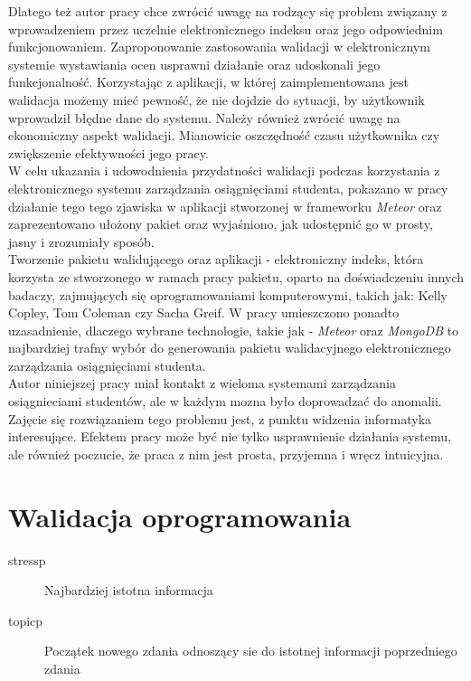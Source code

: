 \documentclass[brudnopis]{xmgr}
\begin{document}
\textcolor{wc}{Dlatego też autor pracy chce zwrócić uwagę na rodzący się problem związany
z wprowadzeniem przez uczelnie elektronicznego indeksu oraz jego odpowiednim
funkcjonowaniem. Zaproponowanie zastosowania walidacji w elektronicznym systemie
wystawiania ocen usprawni działanie oraz udoskonali jego funkcjonalność.
Korzystając z aplikacji, w której zaimplementowana jest walidacja możemy mieć pewność,
że nie dojdzie do sytuacji, by użytkownik wprowadził błędne dane do systemu.
Należy również zwrócić uwagę na ekonomiczny aspekt walidacji. Mianowicie oszczędność
czasu użytkownika czy zwiększenie efektywności jego pracy.}
\\
\indent \textcolor{wc}{W celu ukazania i udowodnienia przydatności walidacji podczas korzystania
z elektronicznego systemu zarządzania osiągnięciami studenta, pokazano w pracy
działanie tego tego zjawiska w aplikacji stworzonej w frameworku \textit{Meteor} oraz
zaprezentowano ułożony pakiet oraz wyjaśniono, jak udostępnić go w prosty, jasny
i zrozumiały sposób.}
\\
\indent \textcolor{wd}{Tworzenie pakietu walidującego oraz aplikacji - elektroniczny indeks, która korzysta
ze stworzonego w ramach pracy pakietu, oparto na doświadczeniu innych badaczy,
zajmujących się oprogramowaniami komputerowymi, takich jak: Kelly Copley, Tom
Coleman czy Sacha Greif.} \textcolor{wa}{W pracy umieszczono ponadto uzasadnienie, dlaczego wybrane
technologie, takie jak - \textit{Meteor} oraz \textit{MongoDB} to najbardziej trafny wybór do generowania
pakietu walidacyjnego elektronicznego zarządzania osiągnięciami studenta.}
\\
\indent \textcolor{wa}{Autor niniejszej pracy miał kontakt z wieloma systemami zarządzania osiągnieciami
studentów, ale w każdym mozna było doprowadzać do anomalii. Zajęcie się rozwiązaniem
tego problemu jest, z punktu widzenia informatyka interesujące. Efektem pracy może być
nie tylko usprawnienie działania systemu, ale również poczucie, że praca z nim jest
prosta, przyjemna i wręcz intuicyjna.}





\chapter{Walidacja oprogramowania}

\begin{description}
\item[stressp] \textcolor{sa}{Najbardziej istotna informacja} 
\item[topicp] \textcolor{sb}{Początek nowego zdania odnoszący sie do istotnej informacji poprzedniego zdania}
\end{description}
\end{document}
